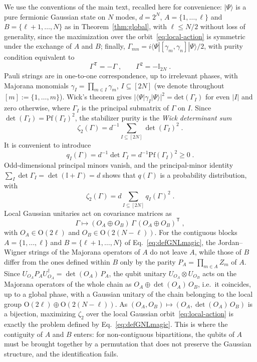 \documentclass[prx,twocolumn,superscriptaddress,aps,10pt, frontmatterverbose, reprint,footinbib,longbibliography=true]{revtex4-2}
\newcommand{\trans}{\mathsf{T}}
\begin{document}
We use the conventions of the main text, recalled here for convenience: $|\Psi\rangle$ is a pure fermionic Gaussian state on $N$ modes, $d=2^N$, $A=\{1,\dots,\ell\}$ and $B=\{\ell+1,\dots,N\}$ as in Theorem~\ref{thm:global}, with $\ell\le N/2$ without loss of generality, since the maximization over the orbit~\eqref{eq:local-action} is symmetric under the exchange of $A$ and $B$; finally, $\Gamma_{mn}=i\langle\Psi|[\gamma_m,\gamma_n]|\Psi\rangle/2$, with purity condition equivalent to
\begin{equation}
    \Gamma^{\trans}=-\Gamma\;,\qquad \Gamma^2=-\mathbb{I}_{2N}\;.
    \label{eq:pure-covariance}
\end{equation}
Pauli strings are in one-to-one correspondence, up to irrelevant phases, with Majorana monomials $\gamma_I=\prod_{m\in I}\gamma_m$, $I\subseteq[2N]$ (we denote throughout $[m]:=\{1,\dots,m\}$). Wick's theorem gives $|\langle\Psi|\gamma_I|\Psi\rangle|^2=\mathrm{det}(\Gamma_I)$ for even $|I|$ and zero otherwise, where $\Gamma_I$ is the principal submatrix of $\Gamma$ on $I$. Since $\det(\Gamma_I)=\mathrm{Pf}(\Gamma_I)^2$, the stabilizer purity is the \emph{Wick determinant sum}
\begin{equation}
    \zeta_2(\Gamma)=d^{-1}\sum_{I\subseteq[2N]}\det(\Gamma_I)^2\;.
    \label{eq:zeta-M}
\end{equation}
It is convenient to introduce
\begin{equation}
    q_I(\Gamma)=d^{-1}\det\Gamma_I=d^{-1}\mathrm{Pf}(\Gamma_I)^2\ge 0\;.
    \label{eq:q-definition}
\end{equation}
Odd-dimensional principal minors vanish, and the principal-minor identity $\sum_I\det\Gamma_I=\det(\mathbb{I}+\Gamma)=d$ shows that $q(\Gamma)$ is a probability distribution, with
\begin{equation}
    \zeta_2(\Gamma)=d\sum_{I\subseteq[2N]} q_I(\Gamma)^2\;.
    \label{eq:q-collision}
\end{equation}
Local Gaussian unitaries act on covariance matrices as
\begin{equation}
    \Gamma\longmapsto (O_A\oplus O_B)\,\Gamma\,(O_A\oplus O_B)^{\trans}\;,
    \label{eq:local-action}
\end{equation}
with $O_A\in\mathrm{O}(2\ell)$ and $O_B\in\mathrm{O}(2(N-\ell))$. For the contiguous blocks $A=\{1,\dots,\ell\}$ and $B=\{\ell+1,\dots,N\}$ of Eq.~\eqref{eq:defGNLmagic}, the Jordan--Wigner strings of the Majorana operators of $A$ do not leave $A$, while those of $B$ differ from the ones defined within $B$ only by the parity $P_A=\prod_{m\in A}Z_m$ of $A$. Since $U_{O_A}P_AU_{O_A}^\dagger=\det(O_A)\,P_A$, the qubit unitary $U_{O_A}\otimes U_{O_B}$ acts on the Majorana operators of the whole chain as $O_A\oplus\det(O_A)\,O_B$, i.e.\ it coincides, up to a global phase, with a Gaussian unitary of the chain belonging to the local group $\mathrm{O}(2\ell)\oplus\mathrm{O}(2(N-\ell))$. As $(O_A,O_B)\mapsto(O_A,\det(O_A)\,O_B)$ is a bijection, maximizing $\zeta_2$ over the local Gaussian orbit~\eqref{eq:local-action} is exactly the problem defined by Eq.~\eqref{eq:defGNLmagic}. This is where the contiguity of $A$ and $B$ enters: for non-contiguous bipartitions, the qubits of $A$ must be brought together by a permutation that does not preserve the Gaussian structure, and the identification fails.
\end{document}
